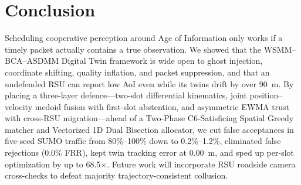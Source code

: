 \documentclass[conference]{IEEEtran}
\begin{document}
\section{Conclusion}
Scheduling cooperative perception around Age of Information only works if a timely packet actually contains a true observation. We showed that the WSMM--BCA--ASDMM Digital Twin framework is wide open to ghost injection, coordinate shifting, quality inflation, and packet suppression, and that an undefended RSU can report low AoI even while its twins drift by over 90~m. By placing a three-layer defence---two-slot differential kinematics, joint position--velocity medoid fusion with first-slot abstention, and asymmetric EWMA trust with cross-RSU migration---ahead of a Two-Phase C6-Satisficing Spatial Greedy matcher and Vectorized 1D Dual Bisection allocator, we cut false acceptances in five-seed SUMO traffic from 80\%--100\% down to 0.2\%--1.2\%, eliminated false rejections (0.0\% FRR), kept twin tracking error at 0.00~m, and sped up per-slot optimization by up to 68.5$\times$. Future work will incorporate RSU roadside camera cross-checks to defeat majority trajectory-consistent collusion.
\end{document}

